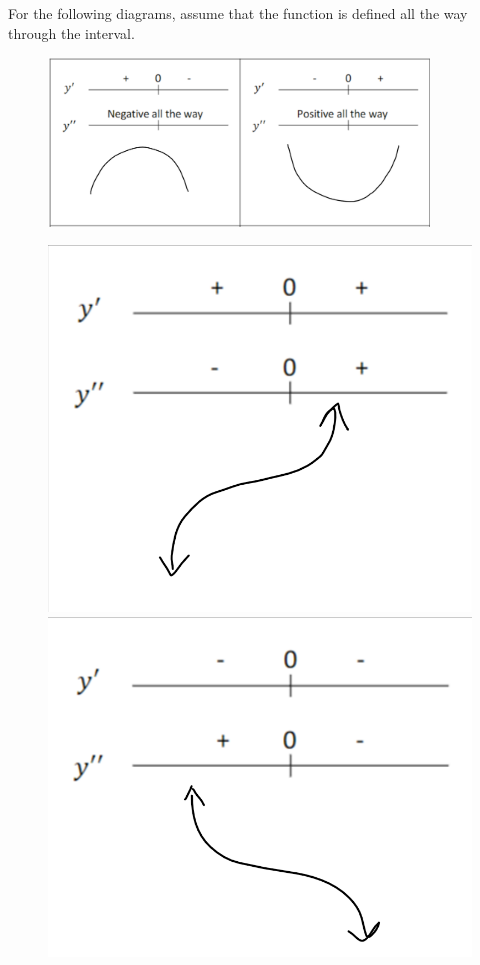 \documentclass{article}
\begin{document}
For the following diagrams, assume that the function is defined all the way through the interval.
\begin{figure}[h]
    \centering
    \includegraphics[width=0.9\textwidth]{imgs/diagram_1_2.png}
\end{figure}
\begin{figure}[h]
    \centering
    \begin{minipage}{0.45\textwidth}
        \centering
        \includegraphics[width=\linewidth]{imgs/diagram_3.png}
    \end{minipage}\hfill
    \begin{minipage}{0.45\textwidth}
        \centering
        \includegraphics[width=\linewidth]{imgs/diagram_4.png}

\end{minipage}
\end{figure}
\end{document}
